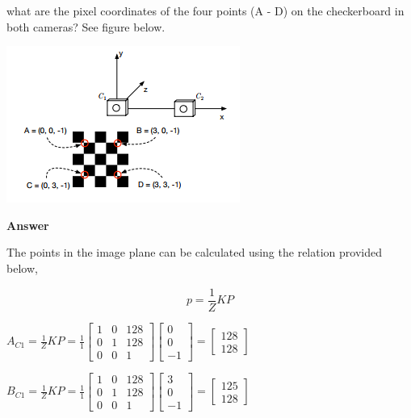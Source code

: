 \documentclass[12pt, letterpaper]{article}
\begin{document}
what are the pixel coordinates of the four points (A - D) on the checkerboard in both cameras?
See figure below.

\begin{center}
\includegraphics[scale=0.7]{figs/checker_board.png}
\end{center}

{\bf{ Answer \\}}

\indent The points in the image plane can be calculated using the relation provided below,

$$ p = \frac{1}{Z}KP $$


\indent $ A_{C1} = \frac{1}{Z}KP = \frac{1}{1}\begin{bmatrix}  1&0&128 \\ 0&1&128 \\ 0&0&1  \end{bmatrix} \begin{bmatrix} 0\\0\\-1 \end{bmatrix} = \begin{bmatrix} 128\\128 \end{bmatrix} $

\vspace{0.4cm}
\indent $ B_{C1} = \frac{1}{Z}KP = \frac{1}{1}\begin{bmatrix}  1&0&128 \\ 0&1&128 \\ 0&0&1  \end{bmatrix} \begin{bmatrix} 3\\0\\-1 \end{bmatrix} = \begin{bmatrix} 125\\128 \end{bmatrix} $
\end{document}
